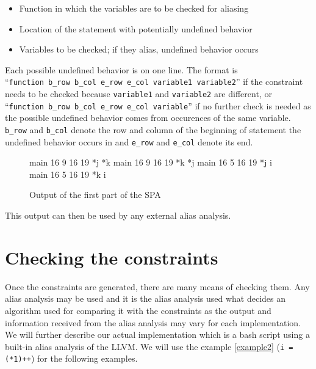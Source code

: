 \begin{itemize}
\item Function in which the variables are to be checked for aliasing
\item Location of the statement with potentially undefined behavior
\item Variables to be checked; if they alias, undefined behavior occurs
\end{itemize}

Each possible undefined behavior is on one line. The format is
\\``\verb|function b_row b_col e_row e_col variable1 variable2|''
if the constraint needs to be checked because \verb|variable1| and \verb|variable2| are different, or
\\``\verb|function b_row b_col e_row e_col variable|''
if no further check is needed as the possible undefined behavior comes from occurences of the same variable. \verb|b_row| and \verb|b_col| denote the row and column of the beginning of statement the undefined behavior occurs in and \verb|e_row| and \verb|e_col| denote its end.

\begin{figure}
\caption{Output of the first part of the SPA}
\label{first-part-output}
\begin{code}
main 16 9 16 19 *j *k
main 16 9 16 19 *k *j
main 16 5 16 19 *j i
main 16 5 16 19 *k i
\end{code}
\end{figure}

This output can then be used by any external alias analysis.

\section{Checking the constraints}
Once the constraints are generated, there are many means of checking them. Any alias analysis may be used and it is the alias analysis used what decides an algorithm used for comparing it with the constraints as the output and information received from the alias analysis may vary for each implementation. We will further describe our actual implementation which is a bash script using a built-in alias analysis of the LLVM. We will use the example \ref{example2} (\verb|i = (*1)++|) for the following examples.

